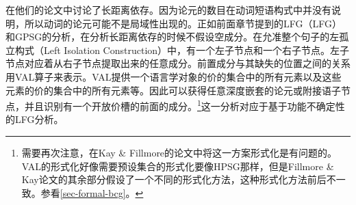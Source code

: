 \mbox{}\citet[\S~3.10]{KF99a}在他们的论文中讨论了长距离依存。因为论元的数目在动词短语构式中并没有说明，所以动词的论元可能不是局域性出现的。正如前面章节提到的LFG\indexlfgc（LFG）和GPSG的分析\indexgpsgc，在分析长距离依存的时候不假设空成分。在允准整个句子的左孤立构式（Left Isolation Construction）中，有一个左子节点和一个右子节点。左子节点对应着从右子节点提取出来的任意成分。前置成分与其缺失的位置之间的关系用VAL算子来表示。VAL提供一个语言学对象的价的集合中的所有元素以及这些元素的价的集合中的所有元素等。因此可以获得任意深度嵌套的论元或附接语子节点，并且识别有一个开放价槽的前面的成分。\footnote{
   需要再次注意，在Kay \& Fillmore的论文中将这一方案形式化是有问题的。VAL的形式化好像需要预设集合的形式化要像HPSG那样，但是Fillmore \& Kay论文的其余部分假设了一个不同的形式化方法，这种形式化方法前后不一致。参看\ref{sec-formal-bcg}。
 }这一分析对应于\citet{KZ89a}基于功能不确定性的LFG分析。%

